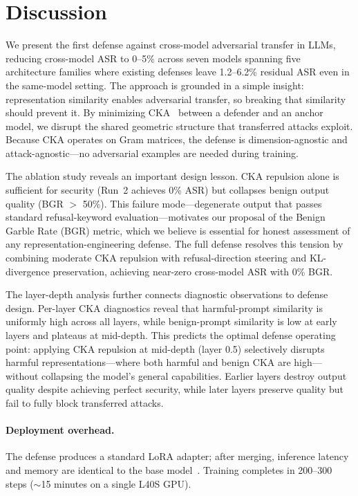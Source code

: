 \section{Discussion}

We present the first defense against cross-model adversarial transfer in LLMs, reducing cross-model ASR to 0--5\% across seven models spanning five architecture families where existing defenses leave 1.2--6.2\% residual ASR even in the same-model setting. The approach is grounded in a simple insight: representation similarity enables adversarial transfer, so breaking that similarity should prevent it. By minimizing CKA~\citep{kornblith2019similarity} between a defender and an anchor model, we disrupt the shared geometric structure that transferred attacks exploit. Because CKA operates on Gram matrices, the defense is dimension-agnostic and attack-agnostic---no adversarial examples are needed during training.

The ablation study reveals an important design lesson. CKA repulsion alone is sufficient for security (Run~2 achieves 0\% ASR) but collapses benign output quality (BGR $>$ 50\%). This failure mode---degenerate output that passes standard refusal-keyword evaluation---motivates our proposal of the Benign Garble Rate (BGR) metric, which we believe is essential for honest assessment of any representation-engineering defense. The full defense resolves this tension by combining moderate CKA repulsion with refusal-direction steering and KL-divergence preservation, achieving near-zero cross-model ASR with 0\% BGR.

The layer-depth analysis further connects diagnostic observations to defense design. Per-layer CKA diagnostics reveal that harmful-prompt similarity is uniformly high across all layers, while benign-prompt similarity is low at early layers and plateaus at mid-depth. This predicts the optimal defense operating point: applying CKA repulsion at mid-depth (layer 0.5) selectively disrupts harmful representations---where both harmful and benign CKA are high---without collapsing the model's general capabilities. Earlier layers destroy output quality despite achieving perfect security, while later layers preserve quality but fail to fully block transferred attacks.

\paragraph{Deployment overhead.}
The defense produces a standard LoRA adapter; after merging, inference latency and memory are identical to the base model~\citep{lora}. Training completes in 200--300 steps (${\sim}$15 minutes on a single L40S GPU).

